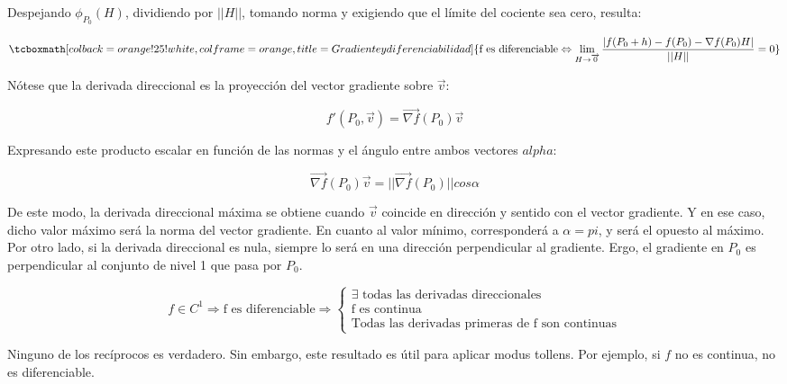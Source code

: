 \documentclass{article}
\begin{document}
Despejando $\phi_{P_0}(H)$, dividiendo por $||H||$, tomando norma y exigiendo que el límite del cociente sea cero, resulta:

\begin{equation}
\tcboxmath[colback=orange!25!white,colframe=orange, title=Gradiente y diferenciabilidad]
{ \text{f es diferenciable} \Leftrightarrow \lim_{H \rightarrow \overrightarrow{0}}\frac{ |f(P_0 + h) - f(P_0) - \nabla{f}(P_0) H| }{||H||} = 0 }
\end{equation}

Nótese que la derivada direccional es la proyección del vector gradiente sobre $\overrightarrow{v}$:

\begin{equation}
f'(P_0, \overrightarrow{v}) = \overrightarrow{ \nabla{f} }(P_0) \overrightarrow{v}
\end{equation}

Expresando este producto escalar en función de las normas y el ángulo entre ambos vectores $alpha$:

\begin{equation}
\overrightarrow{ \nabla{f} }(P_0) \overrightarrow{v} = ||\overrightarrow{ \nabla{f} }(P_0)|| cos \alpha
\end{equation}

De este modo, la derivada direccional máxima se obtiene cuando $\overrightarrow{v}$ coincide en dirección y sentido con el vector gradiente. Y en ese caso, dicho valor máximo será la norma del vector gradiente. En cuanto al valor mínimo, corresponderá a $\alpha=pi$, y será el opuesto al máximo. Por otro lado, si la derivada direccional es nula, siempre lo será en una dirección perpendicular al gradiente. Ergo, el gradiente en $P_0$ es perpendicular al conjunto de nivel 1 que pasa por $P_0$.

\begin{equation}
f \in C^1 \Rightarrow \text{f es diferenciable} \Rightarrow \left\{
\begin{array}{ll}
\exists \text{ todas las derivadas direccionales} \\
\text{f es continua} \\
\text{Todas las derivadas primeras de f son continuas}
\end{array}
\right.
\end{equation}

Ninguno de los recíprocos es verdadero. Sin embargo, este resultado es útil para aplicar modus tollens. Por ejemplo, si $f$ no es continua, no es diferenciable.
\end{document}
